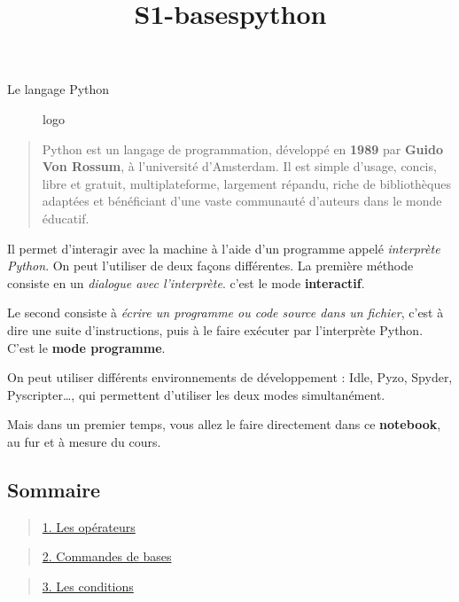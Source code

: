 \documentclass[11pt]{article}
\title{S1-basespython}
\begin{document}
    
    \maketitle
    
    

    
    {Le langage Python}

\begin{figure}
\centering
\caption{logo}
\end{figure}

    \begin{quote}
Python est un langage de programmation, développé en \textbf{1989} par
\textbf{Guido Von Rossum}, à l'université d'Amsterdam. Il est simple
d'usage, concis, libre et gratuit, multiplateforme, largement répandu,
riche de bibliothèques adaptées et bénéficiant d'une vaste communauté
d'auteurs dans le monde éducatif.
\end{quote}

Il permet d'interagir avec la machine à l'aide d'un programme appelé
\emph{interprète Python}. On peut l'utiliser de deux façons différentes.
La première méthode consiste en un \emph{dialogue avec l'interprète}.
c'est le mode \textbf{interactif}.

Le second consiste à \emph{écrire un programme ou code source dans un
fichier}, c'est à dire une suite d'instructions, puis à le faire
exécuter par l'interprète Python. C'est le \textbf{mode programme}.

On peut utiliser différents environnements de développement : Idle,
Pyzo, Spyder, Pyscripter\ldots, qui permettent d'utiliser les deux modes
simultanément.

Mais dans un premier temps, vous allez le faire directement dans ce
\textbf{notebook}, au fur et à mesure du cours.

    \hypertarget{sommaire}{%
\subsection{Sommaire}\label{sommaire}}

\begin{quote}
\hyperref[op]{1. Les opérateurs}
\end{quote}

\begin{quote}
\hyperref[com]{2. Commandes de bases}
\end{quote}

\begin{quote}
\hyperref[cond]{3. Les conditions}
\end{quote}
\end{document}
